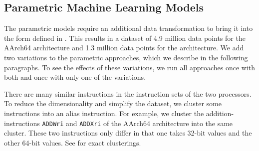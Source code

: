 \subsection{Parametric Machine Learning Models}
The parametric models require an additional data transformation to bring it into the form defined in .
This results in a dataset of 4.9 million data points for the AArch64 architecture and 1.3 million data points for the \aurora architecture.
We add two variations to the parametric approaches, which we describe in the following paragraphs.
To see the effects of these variations, we run all approaches once with both and once with only one of the variations.

There are many similar instructions in the instruction sets of the two processors.
To reduce the dimensionality and simplify the dataset, we cluster some instructions into an alias instruction.
For example, we cluster the addition-instructions \lstinline|ADDWri| and \lstinline|ADDXri| of the AArch64 architecture into the same cluster.
These two instructions only differ in that one takes 32-bit values and the other 64-bit values.
See  for exact clusterings.

